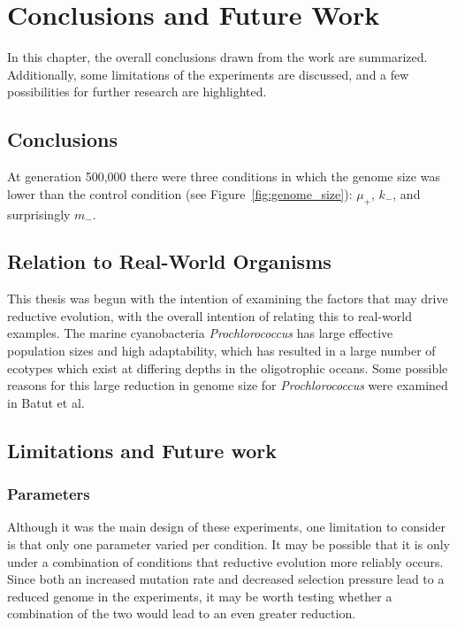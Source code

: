 
\chapter{Conclusions and Future Work}\label{ch:conclusion}

In this chapter, the overall conclusions drawn from the work are summarized. Additionally, some limitations of the experiments are discussed, and a few possibilities for further research are highlighted.

\section{Conclusions}
At generation 500,000 there were three conditions in which the genome size was lower than the control condition (see Figure~\ref{fig:genome_size}): $\mu_+$, $k_-$, and surprisingly $m_-$. 

\section{Relation to Real-World Organisms}
This thesis was begun with the intention of examining the factors that may drive reductive evolution, with the overall intention of relating this to real-world examples. The marine cyanobacteria \textit{Prochlorococcus} has large effective population sizes and high adaptability, which has resulted in a large number of ecotypes which exist at differing depths in the oligotrophic oceans. Some possible reasons for this large reduction in genome size for \textit{Prochlorococcus} were examined in Batut et al.\cite{Batut.2014} 
  
\section{Limitations and Future work}\label{limitations}
\subsection{Parameters}
Although it was the main design of these experiments, one limitation to consider is that only one parameter varied per condition. It may be possible that it is only under a combination of conditions that reductive evolution more reliably occurs. Since both an increased mutation rate and decreased selection pressure lead to a reduced genome in the experiments, it may be worth testing whether a combination of the two would lead to an even greater reduction. 

